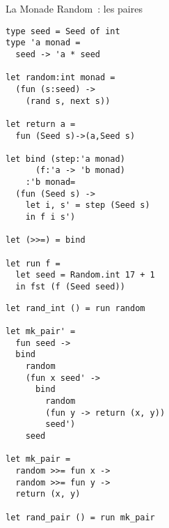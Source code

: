\documentclass[10pt]{beamer}
\begin{document}
\begin{frame}[fragile]{La Monade Random~: les paires}
  \begin{minipage}[l]{0.45\linewidth}
\begin{verbatim}
type seed = Seed of int
type 'a monad =
  seed -> 'a * seed

let random:int monad =
  (fun (s:seed) ->
    (rand s, next s))

let return a =
  fun (Seed s)->(a,Seed s)

let bind (step:'a monad)
      (f:'a -> 'b monad)
    :'b monad=
  (fun (Seed s) ->
    let i, s' = step (Seed s)
    in f i s')

let (>>=) = bind

let run f =
  let seed = Random.int 17 + 1
  in fst (f (Seed seed))
\end{verbatim}
  \end{minipage}
  \hfill
  \begin{minipage}[r]{0.45\linewidth}
  \pause{}
\begin{verbatim}
let rand_int () = run random

let mk_pair' =
  fun seed ->
  bind
    random
    (fun x seed' ->
      bind
        random
        (fun y -> return (x, y))
        seed')
    seed

let mk_pair =
  random >>= fun x ->
  random >>= fun y ->
  return (x, y)

let rand_pair () = run mk_pair
\end{verbatim}
  \end{minipage}
\end{frame}
\end{document}
